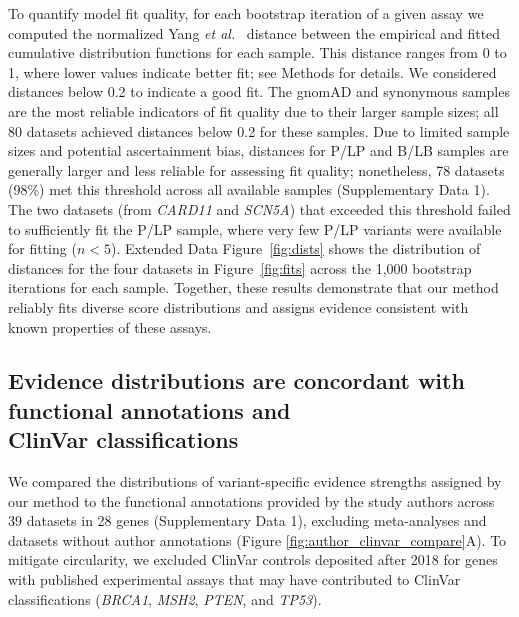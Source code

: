 \documentclass[11pt]{article}
\theoremstyle{plain}
\newcommand{\NumDatasets}{80 }
\newcommand{\NumAuthorAnnotatedDatasets}{39 }
\newcommand{\NumAuthorAnnotatedGenes}{28 }
\newcommand{\NumBootstraps}{1,000 }
\begin{document}
To quantify model fit quality, for each bootstrap iteration of a given assay we computed the normalized Yang \textit{et al.}~\cite{yang2019new} distance between the empirical and fitted cumulative distribution functions for each sample. This distance ranges from 0 to 1, where lower values indicate better fit; see Methods for details. We considered distances below 0.2 to indicate a good fit. The gnomAD and synonymous samples are the most reliable indicators of fit quality due to their larger sample sizes; all \NumDatasets datasets achieved distances below 0.2 for these samples. Due to limited sample sizes and potential ascertainment bias, distances for P/LP and B/LB samples are generally larger and less reliable for assessing fit quality; nonetheless, 78 datasets (98\%) met this threshold across all available samples (Supplementary Data 1). The two datasets (from \textit{CARD11} and \textit{SCN5A}) that exceeded this threshold failed to sufficiently fit the P/LP sample, where very few P/LP variants were available for fitting ($n<5$). Extended Data Figure~\ref{fig:dists} shows the distribution of distances for the four datasets in Figure~\ref{fig:fits} across the \NumBootstraps bootstrap iterations for each sample. Together, these results demonstrate that our method reliably fits diverse score distributions and assigns evidence consistent with known properties of these assays.


\subsection*{Evidence distributions are concordant with functional annotations and\\ ClinVar classifications}
\label{sec:author_label_distr}
We compared the distributions of variant-specific evidence strengths assigned by our method to the functional annotations provided by the study authors across \NumAuthorAnnotatedDatasets datasets in \NumAuthorAnnotatedGenes genes (Supplementary Data 1), excluding meta-analyses and datasets without author annotations (Figure \ref{fig:author_clinvar_compare}A). To mitigate circularity, we excluded ClinVar controls deposited after 2018 for genes with published experimental assays that may have contributed to ClinVar classifications (\textit{BRCA1}, \textit{MSH2}, \textit{PTEN}, and \textit{TP53}). %
\end{document}
